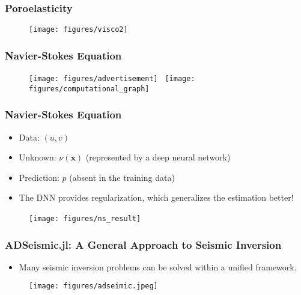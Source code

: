 \documentclass[usenames,dvipsnames]{beamer}
\begin{document}
\begin{frame}
	\frametitle{Poroelasticity}
	\begin{figure}[hbt]
		\texttt{[image: figures/visco2]}
	\end{figure}
	
\end{frame}




\begin{frame}
	\frametitle{Navier-Stokes Equation}
	
	\begin{figure}[hbt]
		\centering
		\texttt{[image: figures/advertisement]}~
		\texttt{[image: figures/computational\_graph]}
	\end{figure}
\end{frame}



\begin{frame}
	\frametitle{Navier-Stokes Equation}
	\begin{itemize}
		\item Data: $(u, v)$
		\item Unknown: $\nu(\mathbf{x})$ (represented by a deep neural network)
		\item Prediction: $p$ (absent in the training data) 
		\item The DNN provides regularization, which generalizes the estimation better!
	\end{itemize}
	\begin{figure}[hbt]
		\centering
		\texttt{[image: figures/ns\_result]}~
	\end{figure}
\end{frame}




\begin{frame}
	\frametitle{ADSeismic.jl: A General Approach to Seismic Inversion}
	\begin{itemize}
		\item Many seismic inversion problems can be solved within a unified framework. 
	\end{itemize}
	\begin{figure}[hbt]
		\texttt{[image: figures/adseimic.jpeg]}
	\end{figure}
	
\end{frame}
\end{document}

